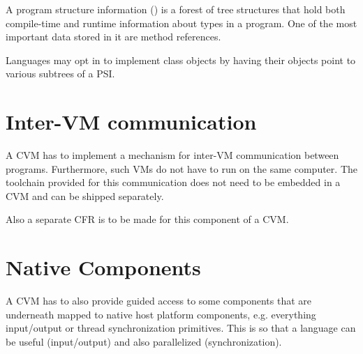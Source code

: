 A program structure information () is a forest of tree structures that hold both compile-time and runtime information about types in a program. One of the most important data stored in it are method references. 

Languages may opt in to implement class objects by having their objects point to various subtrees of a PSI. 





\section{Inter-VM communication} %

A CVM has to implement a mechanism for inter-VM communication between programs. Furthermore, such VMs do not have to run on the same computer. The toolchain provided for this communication does not need to be embedded in a CVM and can be shipped separately. 

Also a separate CFR is to be made for this component of a CVM. 





\section{Native Components} %

A CVM has to also provide guided access to some components that are underneath mapped to native host platform components, e.g. everything input/output or thread synchronization primitives. This is so that a language can be useful (input/output) and also parallelized (synchronization). 





